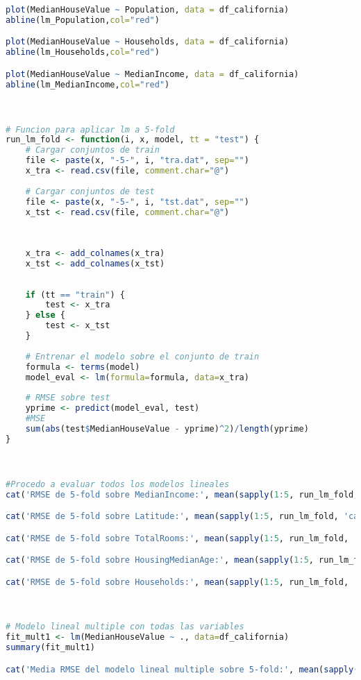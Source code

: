\begin{lstlisting}[language=R]
plot(MedianHouseValue ~ Population, data = df_california)
abline(lm_Population,col="red")

plot(MedianHouseValue ~ Households, data = df_california)
abline(lm_Households,col="red")

plot(MedianHouseValue ~ MedianIncome, data = df_california)
abline(lm_MedianIncome,col="red")



# Funcion para aplicar lm a 5-fold
run_lm_fold <- function(i, x, model, tt = "test") {
	# Cargar conjuntos de train
	file <- paste(x, "-5-", i, "tra.dat", sep="")
	x_tra <- read.csv(file, comment.char="@")
	
	# Cargar conjuntos de test
	file <- paste(x, "-5-", i, "tst.dat", sep="")
	x_tst <- read.csv(file, comment.char="@")
	
	
	
	x_tra <- add_colnames(x_tra)
	x_tst <- add_colnames(x_tst)
	
	
	if (tt == "train") {
		test <- x_tra
	} else {
		test <- x_tst
	}
	
	# Entrenar el modelo sobre el conjunto de train
	formula <- terms(model)
	model_eval <- lm(formula=formula, data=x_tra)
	
	# RMSE sobre test
	yprime <- predict(model_eval, test)
	#MSE
	sum(abs(test$MedianHouseValue - yprime)^2)/length(yprime) 
}



#Procedo a evaluar todos los modelos lineales
cat('RMSE de 5-fold sobre MedianIncome:', mean(sapply(1:5, run_lm_fold, 'california', lm_MedianIncome), fill=T))

cat('RMSE de 5-fold sobre Latitude:', mean(sapply(1:5, run_lm_fold, 'california', lm_Latitude), fill=T))

cat('RMSE de 5-fold sobre TotalRooms:', mean(sapply(1:5, run_lm_fold, 'california', lm_TotalRooms), fill=T))

cat('RMSE de 5-fold sobre HousingMedianAge:', mean(sapply(1:5, run_lm_fold, 'california', lm_HousingMedianAge), fill=T))

cat('RMSE de 5-fold sobre Households:', mean(sapply(1:5, run_lm_fold, 'california', lm_Households), fill=T))



# Modelo lineal multiple con todas las variables
fit_mult1 <- lm(MedianHouseValue ~ ., data=df_california)
summary(fit_mult1)

cat('Media RMSE del modelo lineal multiple sobre 5-fold:', mean(sapply(1:5, run_lm_fold, 'california', fit_mult1), fill=T))



\end{lstlisting}
